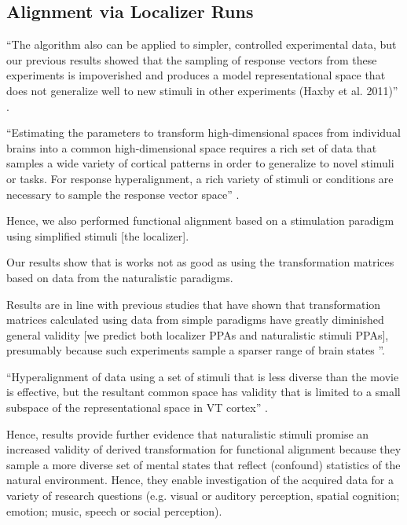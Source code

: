 \subsection{Alignment via Localizer Runs}

%
``The algorithm also can be applied to simpler, controlled experimental data,
but our previous results showed that the sampling of response vectors from these
experiments is impoverished and produces a model representational space that
does not generalize well to new stimuli in other experiments (Haxby et al.
2011)'' \citep{guntupalli2016model}.

%
``Estimating the parameters to transform high-dimensional spaces from individual
brains into a common high-dimensional space requires a rich set of data that
samples a wide variety of cortical patterns in order to generalize to novel
stimuli or tasks.
%
For response hyperalignment, a rich variety of stimuli or conditions are
necessary to sample the response vector space'' \citep{haxby2020hyperalignment}.

%
Hence, we also performed functional alignment based on a stimulation paradigm
using simplified stimuli [the localizer].

%
Our results show that is works not as good as using the transformation matrices
based on data from the naturalistic paradigms.

%
Results are in line with previous studies \citep{haxby2011common,
guntupalli2016model} that have shown that transformation matrices calculated
using data from simple paradigms have greatly diminished general validity [we
predict both localizer PPAs and naturalistic stimuli PPAs], presumably because
such experiments sample a sparser range of brain states
\citep{guntupalli2016model}''.

%
``Hyperalignment of data using a set of stimuli that is less diverse than the
movie is effective, but the resultant common space has validity that is limited
to a small subspace of the representational space in VT cortex''
\citep{haxby2011common}.

%
Hence, results provide further evidence that naturalistic stimuli promise an
increased validity of derived transformation for functional alignment
%
because they sample a more diverse set of mental states that reflect (confound)
statistics of the natural environment.
%
Hence, they enable investigation of the acquired data for a variety of research
questions (e.g.  visual or auditory perception, spatial cognition; emotion;
music, speech or social perception).


